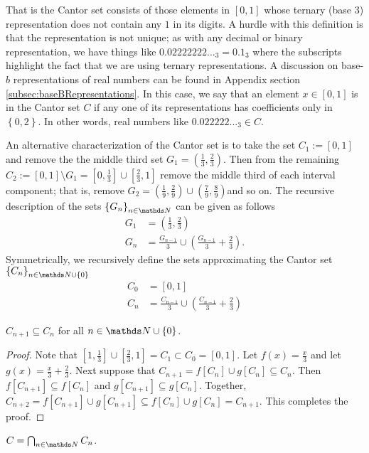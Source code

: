 That is the Cantor set consists of those elements in $\left[0,1\right]$
whose ternary (base 3) representation does not contain any $1$ in
its digits. A hurdle with this definition is that the representation
is not unique; as with any decimal or binary representation, we have
things like $0.02222222..._{3}=0.1_{3}$ where the subscripts highlight
the fact that we are using ternary representations. A discussion on
base-$b$ representations of real numbers can be found in Appendix
section \ref{subsec:baseBRepresentations}. In this case, we say that
an element $x\in\left[0,1\right]$ is in the Cantor set $C$ if any
one of its representations has coefficients only in $\left\{ 0,2\right\} $.
In other words, real numbers like $0.022222..._{3}\in C$.

An alternative characterization of the Cantor set is to take the set
$C_{1}:=\left[0,1\right]$ and remove the the middle third set $G_{1}=\left(\frac{1}{3},\frac{2}{3}\right)$.
Then from the remaining $C_{2}:=\left[0,1\right]\setminus G_{1}=\left[0,\frac{1}{3}\right]\cup\left[\frac{2}{3},1\right]$
remove the middle third of each interval component; that is, remove
$G_{2}=\left(\frac{1}{9},\frac{2}{9}\right)\cup\left(\frac{7}{9},\frac{8}{9}\right)$and
so on. The recursive description of the sets $\left\{ G_{n}\right\} _{n\in\N}$
can be given as follows
\begin{align*}
G_{1} & =\left(\frac{1}{3},\frac{2}{3}\right)\\
G_{n} & =\frac{G_{n-1}}{3}\cup\left(\frac{G_{n-1}}{3}+\frac{2}{3}\right).
\end{align*}
Symmetrically, we recursively define the sets approximating the Cantor
set $\left\{ C_{n}\right\} _{n\in\N\cup\left\{ 0\right\} }$
\begin{align*}
C_{0} & =\left[0,1\right]\\
C_{n} & =\frac{C_{n-1}}{3}\cup\left(\frac{C_{n-1}}{3}+\frac{2}{3}\right)
\end{align*}

\begin{lem}
\label{lem:cantorCnDecreasing}$C_{n+1}\subseteq C_{n}$ for all $n\in\N\cup\left\{ 0\right\} $.
\end{lem}

\begin{proof}
Note that $\left[1,\frac{1}{3}\right]\cup\left[\frac{2}{3},1\right]=C_{1}\subset C_{0}=\left[0,1\right]$.
Let $f\left(x\right)=\frac{x}{3}$ and let $g\left(x\right)=\frac{x}{3}+\frac{2}{3}$.
Next suppose that $C_{n+1}=f\left[C_{n}\right]\cup g\left[C_{n}\right]\subseteq C_{n}.$
Then $f\left[C_{n+1}\right]\subseteq f\left[C_{n}\right]$ and $g\left[C_{n+1}\right]\subseteq g\left[C_{n}\right]$.
Together, $C_{n+2}=f\left[C_{n+1}\right]\cup g\left[C_{n+1}\right]\subseteq f\left[C_{n}\right]\cup g\left[C_{n}\right]=C_{n+1}$.
This completes the proof.
\end{proof}
\begin{prop}
\label{prop:cantorSetIntersectionCn}$C=\bigcap_{n\in\N}C_{n}$.
\end{prop}

